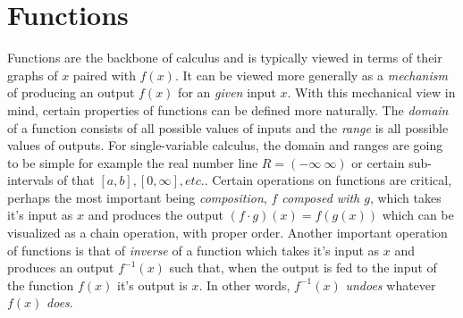 \section{Functions}
\begin{marginfigure}[-5\baselineskip]
\end{marginfigure}
Functions are the backbone of calculus and is typically viewed in terms of their graphs of $x$ paired with $f(x)$. It can be viewed more generally as a {\it mechanism} of producing an output $f(x)$ for an {\it given} input $x$. With this mechanical view in mind, certain properties of functions can be defined more naturally. The {\it domain} of a function consists of all possible values of inputs and the {\it range} is all possible values of outputs. For single-variable calculus, the domain and ranges are going to be simple for example the real number line $R=(-\infty ~\infty)$ or certain sub-intervals of that $[a,b], [0, \infty], etc.$. 
Certain operations on functions are critical, perhaps the most important being \textit{composition}, \textit{$f$ composed with $g$}, which takes it's input as $x$ and produces the output $(f\cdot g)(x)=f(g(x))$ which can be visualized as a chain operation, with proper order.
%
Another important operation of functions is that of \textit{inverse} of a function which takes it's input as $x$ and produces an output $f^{-1}(x)$ such that, when the output is fed to the input of the function $f(x)$ it's output is $x$. In other words, $f^{-1}(x)$ \textit{undoes} whatever $f(x)$ \textit{does}.